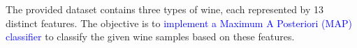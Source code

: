The provided dataset contains three types of wine, each represented 
by 13 distinct features. The objective is to \textcolor{blue}{implement a Maximum A 
Posteriori (MAP) classifier} to classify the given wine samples based 
on these features. 